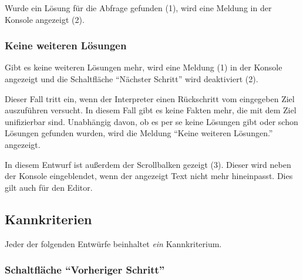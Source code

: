 \documentclass[parskip=full,11pt,twoside]{scrartcl}
\begin{document}
Wurde ein Lösung für die Abfrage gefunden (1), wird eine Meldung in der Konsole angezeigt (2).

\subsubsection{Keine weiteren Lösungen}

\begin{minipage}{\linewidth}
\end{minipage}

Gibt es keine weiteren Lösungen mehr, wird eine Meldung (1) in der Konsole angezeigt und die Schaltfläche \enquote{Nächster Schritt} wird deaktiviert (2).

Dieser Fall tritt ein, wenn der Interpreter einen Rückschritt vom eingegeben Ziel auszuführen versucht.
In diesem Fall gibt es keine Fakten mehr, die mit dem Ziel unifizierbar sind.
Unabhängig davon, ob es per se keine Lösungen gibt oder schon Lösungen gefunden wurden, wird die Meldung \enquote{Keine weiteren Lösungen.} angezeigt.

In diesem Entwurf ist außerdem der Scrollbalken gezeigt (3).
Dieser wird neben der Konsole eingeblendet, wenn der angezeigt Text nicht mehr hineinpasst.
Dies gilt auch für den Editor.

\subsection{Kannkriterien}

Jeder der folgenden Entwürfe beinhaltet \emph{ein} Kannkriterium.

\subsubsection{Schaltfläche \enquote{Vorheriger Schritt}}

\begin{minipage}{\linewidth}
\end{minipage}

\begin{minipage}{\linewidth}
\end{minipage}
\end{document}
